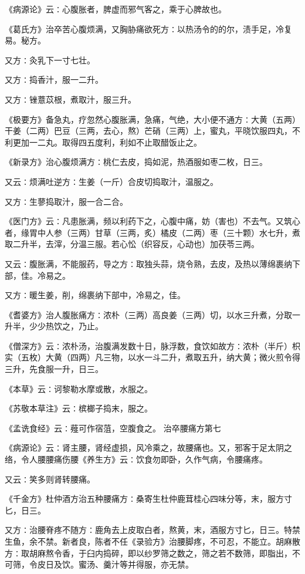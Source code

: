 \documentclass[a4paper,12pt,UTF8,twoside]{ctexbook}
\begin{document}
《病源论》云∶心腹胀者，脾虚而邪气客之，乘于心脾故也。

《葛氏方》治卒苦心腹烦满，又胸胁痛欲死方∶以热汤令的的尔，渍手足，冷复易。秘方。

又方∶灸乳下一寸七壮。

又方∶捣香汁，服一二升。

又方∶锉薏苡根，煮取汁，服三升。

《极要方》备急丸，疗忽然心腹胀满，急痛，气绝，大小便不通方∶大黄（五两）干姜（二两）巴豆（三两，去心，熬）芒硝（三两）上，蜜丸，平晓饮服四丸，不利更加一二丸。取得四五度利，利如不止取醋饭止之。

《新录方》治心腹烦满方∶桃仁去皮，捣如泥，热酒服如枣二枚，日三。

又云∶烦满吐逆方∶生姜（一斤）合皮切捣取汁，温服之。

又方∶生蓼捣取汁，服一合二合。

《医门方》云∶凡患胀满，频以利药下之，心腹中痛，妨（害也）不去气。又筑心者，缘胃中人参（三两）甘草（三两，炙）橘皮（二两）枣（三十颗）水七升，煮取二升半，去滓，分温三服。若心忪（织容反，心动也）加茯苓三两。

又云∶腹胀满，不能服药，导之方∶取独头蒜，烧令熟，去皮，及热以薄绵裹纳下部，佳。冷易之。

又方∶暖生姜，削，绵裹纳下部中，冷易之，佳。

《耆婆方》治人腹胀痛方∶浓朴（三两）高良姜（三两）切，以水三升煮，分取一升半，少少热饮之，乃止。

《僧深方》云∶浓朴汤，治腹满发数十日，脉浮数，食饮如故方∶浓朴（半斤）枳实（五枚）大黄（四两）凡三物，以水一斗二升，煮取五升，纳大黄；微火煎令得三升，先食服一升，日三。

《本草》云∶诃黎勒水摩或散，水服之。

《苏敬本草注》云∶槟榔子捣末，服之。

《孟诜食经》云∶薤可作宿菹，空腹食之。
治卒腰痛方第七

《病源论》云∶肾主腰，肾经虚损，风冷乘之，故腰痛也。又，邪客于足太阴之络，令人腰腰痛伤腰《养生方》云∶饮食勿即卧，久作气病，令腰痛疼。

又云∶笑多则肾转腰痛。

《千金方》杜仲酒方治五种腰痛方∶桑寄生杜仲鹿茸桂心四味分等，末，服方寸匕，日三。

又方∶治腰脊疼不随方∶鹿角去上皮取白者，熬黄，末，酒服方寸匕，日三。特禁生鱼，余不禁。新者良，陈者不任《录验方》治腰脚疼，不可忍，不能立。胡麻散方∶取胡麻熬令香，于臼内捣碎，即以纱罗筛之数之，筛之若不数筛，即脂出，不可筛，令皮日及饮。蜜汤、羹汁等并得服，亦无禁。
\end{document}
